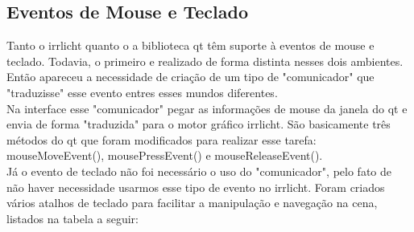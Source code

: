 	\subsection{Eventos de Mouse e Teclado}
	Tanto o irrlicht quanto o a biblioteca qt têm suporte à eventos de mouse e teclado. Todavia, o primeiro e realizado de forma distinta nesses dois ambientes. Então apareceu a necessidade de criação de um tipo de "comunicador" que "traduzisse" esse evento entres esses mundos diferentes.\\

	Na interface esse "comunicador" pegar as informações de mouse da janela do qt e envia de forma "traduzida" para o motor gráfico irrlicht. São basicamente três métodos do qt que foram modificados para realizar esse tarefa: mouseMoveEvent(), mousePressEvent() e mouseReleaseEvent().\\

	Já o evento de teclado não foi necessário o uso do "comunicador", pelo fato de não haver necessidade usarmos esse tipo de evento no irrlicht. Foram criados vários atalhos de teclado para facilitar a manipulação e navegação na cena, listados na tabela a seguir:

